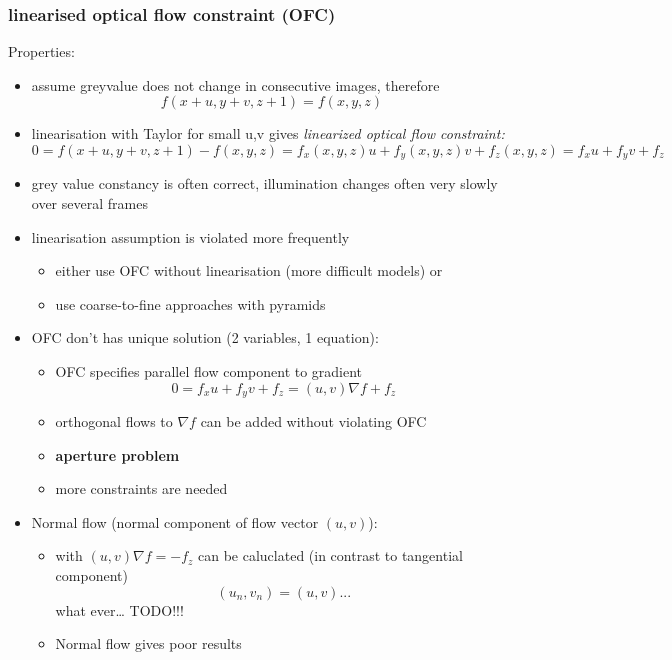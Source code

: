 \documentclass[11pt]{article}
\begin{document}
\subsubsection{linearised optical flow constraint (OFC)}
\label{sec-3-1-1}
Properties:
\begin{itemize}
\item assume greyvalue does not change in consecutive images, therefore
      \[ f(x+u,y+v,z+1) = f(x,y,z) \]
\item linearisation with Taylor for small u,v gives \emph{linearized optical flow constraint:}
      \[ 0=f(x+u,y+v,z+1)-f(x,y,z) = f_x(x,y,z)u+f_y(x,y,z)v+f_z(x,y,z)= 
         f_xu+f_yv+f_z\]
\item grey value constancy is often correct, illumination changes often very slowly
over several frames
\item linearisation assumption is violated more frequently
\begin{itemize}
\item either use OFC without linearisation (more difficult models) or
\item use coarse-to-fine approaches with pyramids
\end{itemize}
\item OFC don't has unique solution (2 variables, 1 equation):
\begin{itemize}
\item OFC specifies parallel flow component to gradient
        \[ 0= f_xu+f_yv+f_z=(u,v)\nabla f +f_z \]
\item orthogonal flows to $\nabla f$ can be added without violating OFC
\item \textbf{aperture problem}
\item more constraints are needed
\end{itemize}
\item Normal flow (normal component of flow vector $(u,v)$):
\begin{itemize}
\item with $(u,v)\nabla f = -f_z$ can be caluclated (in contrast to tangential component)
\[ (u_n,v_n) = (u,v)...  \]
what ever\ldots{} TODO!!!
\item Normal flow gives poor results
\end{itemize}
\end{itemize}
\end{document}
